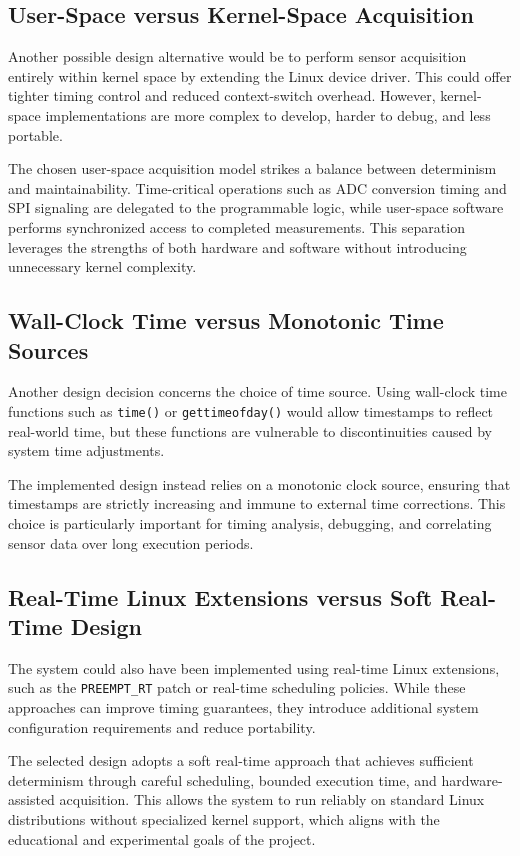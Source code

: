 \subsection{User-Space versus Kernel-Space Acquisition}
Another possible design alternative would be to perform sensor acquisition entirely within kernel space by extending the Linux device driver. This could offer tighter timing control and reduced context-switch overhead. However, kernel-space implementations are more complex to develop, harder to debug, and less portable.

The chosen user-space acquisition model strikes a balance between determinism and maintainability. Time-critical operations such as ADC conversion timing and SPI signaling are delegated to the programmable logic, while user-space software performs synchronized access to completed measurements. This separation leverages the strengths of both hardware and software without introducing unnecessary kernel complexity.

\subsection{Wall-Clock Time versus Monotonic Time Sources}
Another design decision concerns the choice of time source. Using wall-clock time functions such as \texttt{time()} or \texttt{gettimeofday()} would allow timestamps to reflect real-world time, but these functions are vulnerable to discontinuities caused by system time adjustments.

The implemented design instead relies on a monotonic clock source, ensuring that timestamps are strictly increasing and immune to external time corrections. This choice is particularly important for timing analysis, debugging, and correlating sensor data over long execution periods.

\subsection{Real-Time Linux Extensions versus Soft Real-Time Design}
The system could also have been implemented using real-time Linux extensions, such as the \texttt{PREEMPT\_RT} patch or real-time scheduling policies. While these approaches can improve timing guarantees, they introduce additional system configuration requirements and reduce portability.

The selected design adopts a soft real-time approach that achieves sufficient determinism through careful scheduling, bounded execution time, and hardware-assisted acquisition. This allows the system to run reliably on standard Linux distributions without specialized kernel support, which aligns with the educational and experimental goals of the project.


